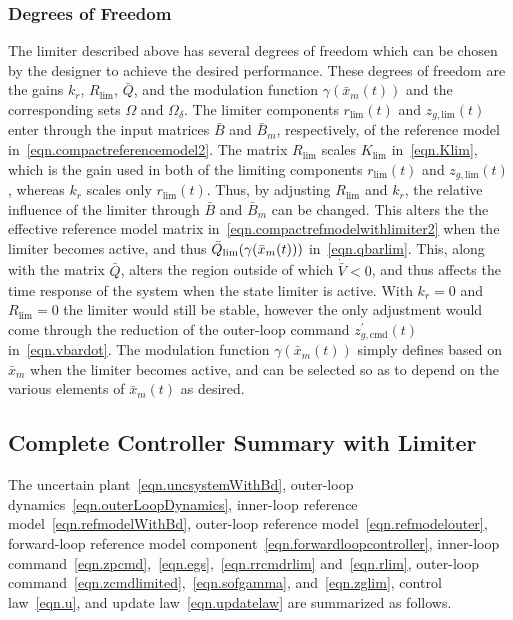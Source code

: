 \documentclass[journal]{IEEEtran}
\theoremstyle{innercustomthm}
\begin{document}
  \subsubsection{Degrees of Freedom}

  The limiter described above has several degrees of freedom which can be chosen by the designer to achieve the desired performance.
  These degrees of freedom are the gains $k_{r}$, $R_{\text{lim}}$, $\bar{Q}$, and the modulation function $\gamma(\bar{x}_{m}(t))$ and the corresponding sets $\Omega$ and $\Omega_{\delta}$.
  The limiter components $r_{\text{lim}}(t)$ and $z_{g,\text{lim}}(t)$ enter through the input matrices $\bar{B}$ and $\bar{B}_{m}$, respectively, of the reference model in\ \eqref{eqn.compactreferencemodel2}.
  The matrix $R_{\text{lim}}$ scales $K_{\text{lim}}$ in\ \eqref{eqn.Klim}, which is the gain used in both of the limiting components $r_{\text{lim}}(t)$ and $z_{g,\text{lim}}(t)$, whereas $k_{r}$ scales only $r_{\text{lim}}(t)$.
  Thus, by adjusting $R_{\text{lim}}$ and $k_{r}$, the relative influence of the limiter through $\bar{B}$ and $\bar{B}_{m}$ can be changed.
  This alters the the effective reference model matrix in\ \eqref{eqn.compactrefmodelwithlimiter2} when the limiter becomes active, and thus $\bar{Q}_{\rm{\lim}}(\gamma(\bar{x}_{m}(t)))$ in\ \eqref{eqn.qbarlim}.
  This, along with the matrix $\bar{Q}$, alters the region outside of which $\dot{\bar{V}}<0$, and thus affects the time response of the system when the state limiter is active.
  With $k_{r}=0$ and $R_{\text{lim}}=0$ the limiter would still be stable, however the only adjustment would come through the reduction of the outer-loop command $z_{g,\text{cmd}}^{\prime}(t)$ in\ \eqref{eqn.vbardot}.
  The modulation function $\gamma(\bar{x}_{m}(t))$ simply defines based on $\bar{x}_{m}$ when the limiter becomes active, and can be selected so as to depend on the various elements of $\bar{x}_{m}(t)$ as desired.

  \subsection{Complete Controller Summary with Limiter}

  The uncertain plant\ \eqref{eqn.uncsystemWithBd}, outer-loop dynamics\ \eqref{eqn.outerLoopDynamics}, inner-loop reference model\ \eqref{eqn.refmodelWithBd}, outer-loop reference model\ \eqref{eqn.refmodelouter}, forward-loop reference model component\ \eqref{eqn.forwardloopcontroller}, inner-loop command\ \eqref{eqn.zpcmd},\ \eqref{eqn.egs},\ \eqref{eqn.rrcmdrlim} and\ \eqref{eqn.rlim}, outer-loop command\ \eqref{eqn.zcmdlimited},\ \eqref{eqn.sofgamma}, and\ \eqref{eqn.zglim}, control law\ \eqref{eqn.u}, and update law\ \eqref{eqn.updatelaw} are summarized as follows.
\end{document}
